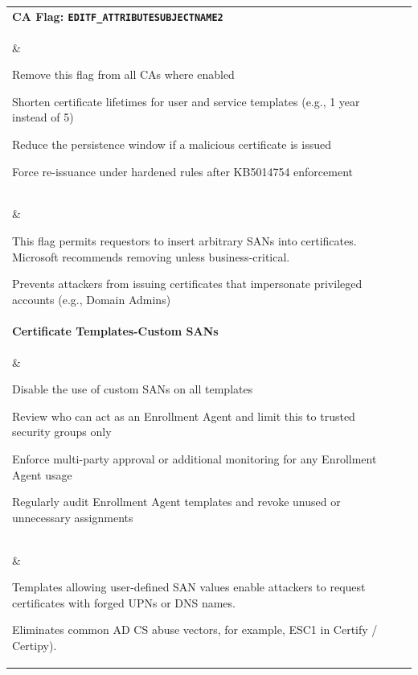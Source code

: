 {\begin{table}[htbp]
\begin{tabular}{|p{3.5cm}|p{6cm}|p{6cm}|}
\textbf{CA Flag: \texttt{EDITF\_ATTRIBUTESUBJECTNAME2}} \\\& 
\begin{compactitem}
    \item Remove this flag from all CAs where enabled
    \item Shorten certificate lifetimes for user and service templates (e.g., 1 year instead of 5)
    \item Reduce the persistence window if a malicious certificate is issued
    \item Force re-issuance under hardened rules after KB5014754 enforcement
\end{compactitem} \\\& 
\begin{compactitem}
    \item This flag permits requestors to insert arbitrary SANs into certificates. Microsoft recommends removing unless business-critical.
\end{compactitem} 
\begin{compactitem}
    \item Prevents attackers from issuing certificates that impersonate privileged accounts (e.g., Domain Admins)
\end{compactitem} \\
\hline

\textbf{Certificate Templates-Custom SANs} \\\& 
\begin{compactitem}
    \item Disable the use of custom SANs on all templates
    \item Review who can act as an Enrollment Agent and limit this to trusted security groups only
    \item Enforce multi-party approval or additional monitoring for any Enrollment Agent usage
    \item Regularly audit Enrollment Agent templates and revoke unused or unnecessary assignments
\end{compactitem} \\\& 
\begin{compactitem}
    \item Templates allowing user-defined SAN values enable attackers to request certificates with forged UPNs or DNS names.
\end{compactitem} 
\begin{compactitem}
    \item Eliminates common AD CS abuse vectors, for example, ESC1 in Certify / Certipy).
\end{compactitem}
\hline


\end{tabular}
\end{table}}
